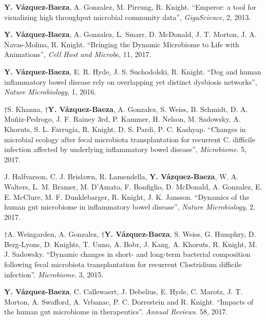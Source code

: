 \begin{frontmatter}
\begin{vitapage}
\begin{publications}
    \item \textbf{Y. V\'azquez-Baeza}, A. Gonzalez, M. Pirrung, R. Knight. ``Emperor: a tool for visualizing high throughput microbial community data'', \emph{GigaScience}, 2, 2013.

    \item \textbf{Y. V\'azquez-Baeza}, A. Gonzalez, L. Smarr, D. McDonald, J. T. Morton, J. A. Navas-Molina, R. Knight. ``Bringing the Dynamic Microbiome to Life with Animations'', \emph{Cell Host and Microbe}, 11, 2017.

    \item \textbf{Y. V\'azquez-Baeza}, E. R. Hyde, J. S. Suchodolski, R. Knight. ``Dog and human inflammatory bowel disease rely on overlapping yet distinct dysbiosis networks'', \emph{Nature Microbiology}, 1, 2016.

    \item  $\dagger$S. Khanna, \textbf{$\dagger$Y. V\'azquez-Baeza}, A.  
        Gonzalez, S. Weiss, B. Schmidt, D. A. Muñiz-Pedrogo, J. F. Rainey 3rd, 
        P. Kammer, H. Nelson, M. Sadowsky, A. Khoruts, S. L. Farrugia, R.  
        Knight, D. S. Pardi, P. C. Kashyap. ``Changes in microbial ecology 
        after fecal microbiota transplantation for recurrent C. difficile 
        infection affected by underlying inflammatory bowel disease'', 
        \emph{Microbiome}. 5, 2017.

    \item J. Halfvarson, C. J. Brislawn, R. Lamendella, \textbf{Y. V\'azquez-Baeza}, W. A. Walters, L. M. Bramer, M. D'Amato, F. Bonfiglio, D. McDonald, A. Gonzalez, E. E. McClure, M. F. Dunklebarger, R. Knight, J. K. Jansson. ``Dynamics of the human gut microbiome in inflammatory bowel disease'', \emph{Nature Microbiology}, 2, 2017.
  
    \item $\dagger$A. Weingarden, A. Gonzalez, \textbf{$\dagger$Y.  
        V\'azquez-Baeza}, S. Weiss, G. Humphry, D. Berg-Lyons, D. Knights, T.  
        Unno, A. Bobr, J. Kang, A. Khoruts, R. Knight, M. J. Sadowsky.  
        ``Dynamic changes in short- and long-term bacterial composition 
        following fecal microbiota transplantation for recurrent Clostridium 
        difficile infection''. \emph{Microbiome}. 3, 2015.

    \item \textbf{Y. V\'azquez-Baeza}, C. Callewaert, J. Debelius, E. Hyde, C. Marotz, J. T. Morton, A. Swafford, A. Vrbanac, P. C. Dorrestein and R. Knight. ``Impacts of the human gut microbiome in therapeutics''. \emph{Annual Reviews}. 58, 2017.


\end{publications}
\end{vitapage}
\end{frontmatter}
